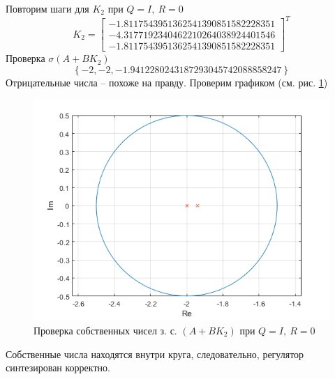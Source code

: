 \documentclass[a4paper, 12pt]{article}
\begin{document}
    Повторим шаги для $K_2$ при $Q=I,\ R=0$
    $$
    K_2=\begin{bmatrix}
        -1.8117543951362541390851582228351\\-4.3177192340462210264038924401546\\-1.8117543951362541390851582228351
    \end{bmatrix}^T
    $$
    Проверка $\sigma\left( A+BK_2  \right)$
    $$
    \left\{ -2, -2, -1.9412280243187293045742088858247 \right\}
    $$
    Отрицательные числа -- похоже на правду. Проверим графиком (см. рис. \ref{3task_eig_QI_R0})
    \begin{figure}[H]
        \centering
        \includegraphics[scale=0.75]{3task_eig_QI_R0.png}
        \captionsetup{skip=0pt}
        \caption{Проверка собственных чисел з. с. $\left(A+BK_2\right)$ при $Q=I,\ R=0$}
        \label{3task_eig_QI_R0}
    \end{figure}
    \noindent Собственные числа находятся внутри круга, следовательно, регулятор синтезирован корректно.
\end{document}

